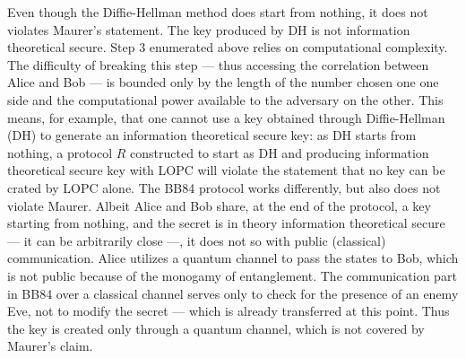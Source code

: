 	 Even though the Diffie-Hellman method does start from nothing, it does not violates Maurer's statement.
	 The key produced by DH is not information theoretical secure. 
	 Step $3$ enumerated above relies on computational complexity.
	 The difficulty of breaking this step --- thus accessing the correlation between Alice and Bob --- is bounded only by the length of the number chosen one one side and the computational power available to the adversary on the other.
	 This means, for example, that one cannot use a key obtained through Diffie-Hellman (DH) to generate an information theoretical secure key: 
	 as DH starts from nothing, a protocol $R$ constructed to start as DH and producing information theoretical secure key with LOPC will violate the statement that no key can be crated by LOPC alone.
	 The BB84 protocol works differently, but also does not violate Maurer.
	 Albeit Alice and Bob share, at the end of the protocol, a key starting from nothing, and the secret is in theory information theoretical secure --- it can be arbitrarily close ---, it does not so with public (classical) communication.
	 Alice utilizes a quantum channel to pass the states to Bob, which is not public because of the monogamy of entanglement.
	 The communication part in BB84 over a classical channel serves only to check for the presence of an enemy Eve, not to modify the secret --- which is already transferred at this point.  
	 Thus the key is created only through a quantum channel, which is not covered by Maurer's claim.

%	
	 
